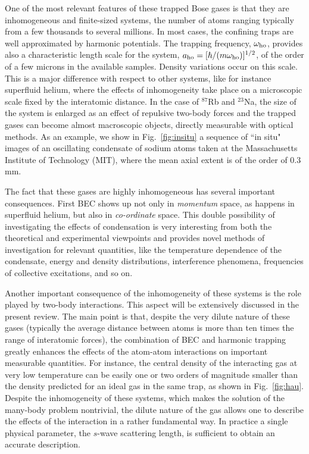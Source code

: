 One of the most relevant features of these trapped Bose gases is that they 
are inhomogeneous and finite-sized systems, the number of atoms ranging 
typically from a few thousands to several millions. In most cases, the 
confining traps are well approximated by harmonic potentials. The trapping
frequency, $\omega_{\rm ho}$, provides also a characteristic length scale 
for the system, $a_{\rm ho} = [\hbar / ( m \omega_{\rm ho} ) ]^{1/2}$, of 
the order of a few microns in the available samples. Density variations 
occur on this scale. This is a major difference with respect to other 
systems, like for instance superfluid helium, where the effects of 
inhomogeneity take place on a microscopic scale fixed by the interatomic 
distance.  In the case of $^{87}$Rb  and $^{23}$Na, the size of the system 
is enlarged as an effect of repulsive two-body forces and  the trapped gases 
can become almost macroscopic objects, directly measurable with optical 
methods. As an example, we show in Fig.~\ref{fig:insitu} a sequence of 
``in situ" images of an oscillating condensate of sodium atoms taken 
at the Massachusetts Institute of Technology (MIT), where the mean axial 
extent is of the order of $0.3$ mm. 

The fact that these gases are highly inhomogeneous has several
important consequences. First BEC shows up not only  in { \it momentum}
space, as happens in superfluid helium,  but also in {\it co-ordinate}
space. This double possibility of investigating  the effects of
condensation is very interesting from both the theoretical  and
experimental viewpoints and provides novel methods of investigation
for relevant quantities, like the temperature dependence 
of the condensate, energy and density distributions, interference 
phenomena, frequencies of collective excitations, and so on.

Another important consequence of the inhomogeneity of these systems
is the role played by two-body interactions. This aspect 
will be extensively discussed in the present review. The main point is 
that, despite the very dilute nature of these gases (typically the 
average distance between atoms is more than ten times  the range of
interatomic forces), the combination of BEC and harmonic trapping
greatly enhances the effects of the atom-atom interactions on important 
measurable quantities. For instance, the central density of the 
interacting gas at very low temperature can be easily one or two 
orders of magnitude smaller than the density  predicted for an ideal 
gas in the same trap, as shown in Fig.~\ref{fig:hau}. Despite the 
inhomogeneity of these systems, which makes the solution of the 
many-body problem nontrivial, the dilute nature of the gas allows 
one to describe the effects of the interaction in a rather fundamental 
way. In practice a single physical parameter, the $s$-wave scattering  
length, is sufficient to obtain an accurate description.

